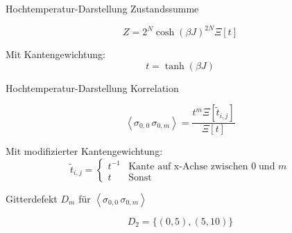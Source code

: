 \documentclass[11pt]{beamer}
\newcommand{\corr}[1]{\left\langle #1 \right\rangle}
\begin{document}
    \begin{frame}{Hochtemperatur-Darstellung Zustandssumme}
    
    \begin{grayframe}[frametitle = {Zustandssumme}]
    \begin{equation} \nonumber
    Z = 2^N \cosh(\beta J)^{2N} \Xi[t] 
    \end{equation}
    
    \vspace{0.5cm}
    
    Mit Kantengewichtung:  
    \begin{equation} \nonumber
    t = \tanh(\beta J) 
    \end{equation}
    \end{grayframe}
    
    \end{frame}
    
    \begin{frame}{Hochtemperatur-Darstellung Korrelation}
    
    \begin{grayframe}[frametitle = {Spin-Spin-Korrelation}]
    \begin{equation} \nonumber
    \corr{\sigma_{0,0}\,\sigma_{0,m}} = \frac{t^m \Xi[\tilde{t}_{i,j}]}{\Xi[t]} 
    \end{equation}
    
    \vspace{0.5cm}
    Mit modifizierter Kantengewichtung: 
    \begin{equation} \nonumber
    \tilde{t}_{i,j} = \left\{\begin{array}{ll} t^{-1} & \text{Kante auf x-Achse zwischen } 0 \; \text{und } m\\
          t & \text{Sonst} \end{array} \right.
    \end{equation}
    \end{grayframe}
    \end{frame}
    
    \begin{frame}{Gitterdefekt $D_m$ für $\corr{\sigma_{0,0}\,\sigma_{0,m}}$}
    
    \begin{equation} \nonumber 
        D_2 = \{(0,5), (5,10)\}
    \end{equation}
    \begin{figure}[h!]
        \centering
        
    \end{figure}
    
    \end{frame}
    
\end{document}
